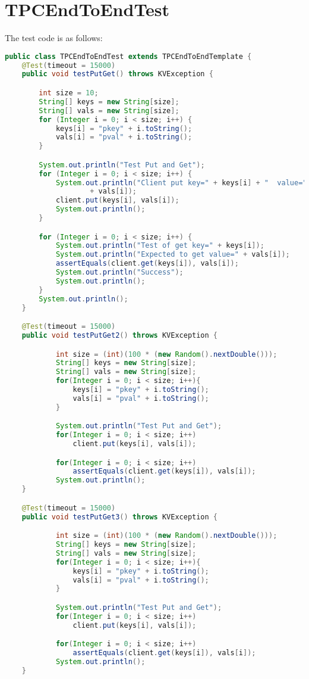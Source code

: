 \documentclass{article}
\begin{document}
\section{TPCEndToEndTest}
The test code is as follows:
\begin{lstlisting}[language=java]
public class TPCEndToEndTest extends TPCEndToEndTemplate {
	@Test(timeout = 15000)
	public void testPutGet() throws KVException {

		int size = 10;
		String[] keys = new String[size];
		String[] vals = new String[size];
		for (Integer i = 0; i < size; i++) {
			keys[i] = "pkey" + i.toString();
			vals[i] = "pval" + i.toString();
		}

		System.out.println("Test Put and Get");
		for (Integer i = 0; i < size; i++) {
			System.out.println("Client put key=" + keys[i] + "  value="
					+ vals[i]);
			client.put(keys[i], vals[i]);
			System.out.println();
		}

		for (Integer i = 0; i < size; i++) {
			System.out.println("Test of get key=" + keys[i]);
			System.out.println("Expected to get value=" + vals[i]);
			assertEquals(client.get(keys[i]), vals[i]);
			System.out.println("Success");
			System.out.println();
		}
		System.out.println();
	}

	@Test(timeout = 15000)
    public void testPutGet2() throws KVException {

			int size = (int)(100 * (new Random().nextDouble()));
			String[] keys = new String[size];
			String[] vals = new String[size];
			for(Integer i = 0; i < size; i++){
				keys[i] = "pkey" + i.toString();
				vals[i] = "pval" + i.toString();
			}

			System.out.println("Test Put and Get");
			for(Integer i = 0; i < size; i++)
				client.put(keys[i], vals[i]);

			for(Integer i = 0; i < size; i++)
				assertEquals(client.get(keys[i]), vals[i]);
			System.out.println();
	}

	@Test(timeout = 15000)
    public void testPutGet3() throws KVException {

			int size = (int)(100 * (new Random().nextDouble()));
			String[] keys = new String[size];
			String[] vals = new String[size];
			for(Integer i = 0; i < size; i++){
				keys[i] = "pkey" + i.toString();
				vals[i] = "pval" + i.toString();
			}

			System.out.println("Test Put and Get");
			for(Integer i = 0; i < size; i++)
				client.put(keys[i], vals[i]);

			for(Integer i = 0; i < size; i++)
				assertEquals(client.get(keys[i]), vals[i]);
			System.out.println();
	}


\end{lstlisting}
\end{document}
